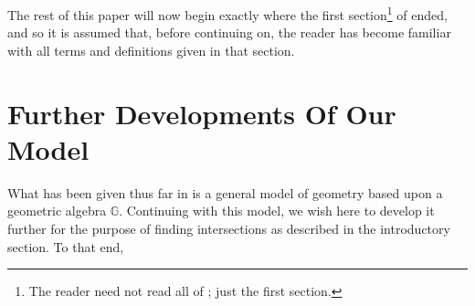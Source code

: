 \documentclass{birkjour}
\theoremstyle{definition}
\theoremstyle{remark}
\numberwithin{equation}{section}
\newcommand{\G}{\mathbb{G}}
\begin{document}
The rest of this paper will now begin exactly where the first section\footnote{The reader
need not read all of \cite{}; just the first section.} of \cite{} ended, and
so it is assumed that, before continuing on, the reader has become familiar with
all terms and definitions given in that section.

\section{Further Developments Of Our Model}

What has been given thus far in \cite{} is a general model of geometry based upon
a geometric algebra $\G$.  Continuing with this model, we wish here to develop it
further for the purpose of finding intersections as described in the introductory section.
To that end,
\end{document}
